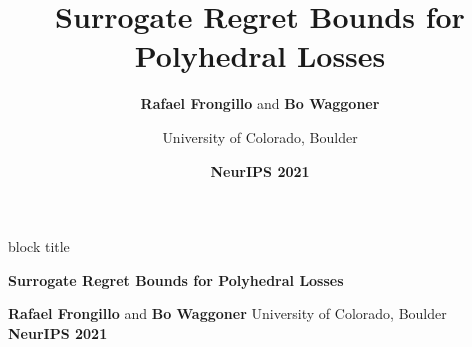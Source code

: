 \documentclass[mathserif,12pt]{beamer}
\title{\LARGE\textbf{Surrogate Regret Bounds for Polyhedral Losses}\vspace*{-5pt}}
\author{{\large\textbf{Rafael Frongillo} and \textbf{Bo Waggoner}} \and {\large University of Colorado, Boulder}}
\date{\large\textbf{NeurIPS 2021}}
\begin{document}

\begin{frame}{}
  \vspace*{-15pt}
  
  \begin{beamercolorbox}{block title}
    \smallskip
    
    \textbf{\hfill \LARGE Surrogate Regret Bounds for Polyhedral Losses \hfill}
    \smallskip
  \end{beamercolorbox}

  \smallskip
  \hfill
  {\large\textbf{Rafael Frongillo} and \textbf{Bo Waggoner}}
  \hspace{20pt}
  {\large University of Colorado, Boulder}
  \hfill
  {\large \textbf{NeurIPS 2021}}
  \hfill~
  
  \vspace*{-30pt}
  
\end{frame}
\end{document}
